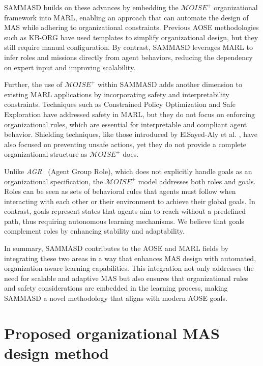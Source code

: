 \documentclass[conference]{IEEEtran}
\begin{document}
SAMMASD builds on these advances by embedding the $\mathcal{M}OISE^+$ organizational framework into MARL, enabling an approach that can automate the design of MAS while adhering to organizational constraints. Previous AOSE methodologies such as KB-ORG \cite{kborg2001} have used templates to simplify organizational design, but they still require manual configuration. By contrast, SAMMASD leverages MARL to infer roles and missions directly from agent behaviors, reducing the dependency on expert input and improving scalability.

Further, the use of $\mathcal{M}OISE^+$ within SAMMASD adds another dimension to existing MARL applications by incorporating safety and interpretability constraints. Techniques such as Constrained Policy Optimization \cite{zhao2024} and Safe Exploration \cite{melcer2024} have addressed safety in MARL, but they do not focus on enforcing organizational rules, which are essential for interpretable and compliant agent behavior. Shielding techniques, like those introduced by ElSayed-Aly et al. \cite{elsayed2021}, have also focused on preventing unsafe actions, yet they do not provide a complete organizational structure as $\mathcal{M}OISE^+$ does.

Unlike \textit{AGR}~\cite{ferber2003} (Agent Group Role), which does not explicitly handle goals as an organizational specification, the $\mathcal{M}OISE^+$ model addresses both roles and goals. Roles can be seen as sets of behavioral rules that agents must follow when interacting with each other or their environment to achieve their global goals. In contrast, goals represent states that agents aim to reach without a predefined path, thus requiring autonomous learning mechanisms. We believe that goals complement roles by enhancing stability and adaptability.

In summary, SAMMASD contributes to the AOSE and MARL fields by integrating these two areas in a way that enhances MAS design with automated, organization-aware learning capabilities. This integration not only addresses the need for scalable and adaptive MAS but also ensures that organizational rules and safety considerations are embedded in the learning process, making SAMMASD a novel methodology that aligns with modern AOSE goals.



\section{Proposed organizational MAS design method}
\label{sec:sammasd_presentation}
\end{document}
